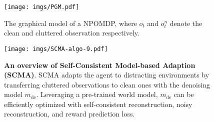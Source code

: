 \begin{figure}
    \centering
    \texttt{[image: imgs/PGM.pdf]}
    \caption{The graphical model of a NPOMDP, where $o_t$ and $o^n_t$ denote the clean and cluttered observation respectively.}
    \vspace{-1em}
    \label{fig_pgm}
\end{figure}

\begin{figure*}[tb]
\centering
\centerline{\texttt{[image: imgs/SCMA-algo-9.pdf]}}
\caption{\textbf{An overview of Self-Consistent Model-based Adaption (SCMA)}. SCMA adapts the agent to distracting environments by transferring cluttered observations to clean ones with the denoising model $m_{\mathrm{de}}$. Leveraging a pre-trained world model, $m_{\mathrm{de}}$ can be efficiently optimized with self-consistent reconstruction, noisy reconstruction, and reward prediction loss.}
\label{fig_scma_algo}
\vspace{-1.2em}
\end{figure*}